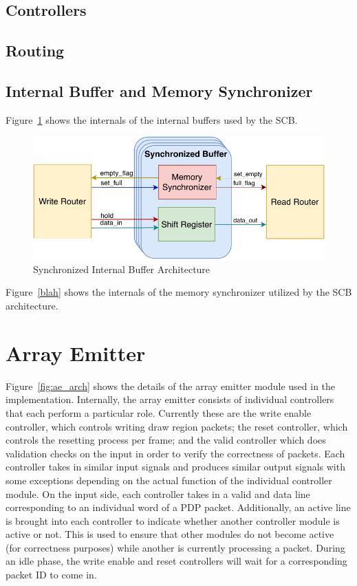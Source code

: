     \subsection{Controllers}

    \subsection{Routing}

    \subsection{Internal Buffer and Memory Synchronizer}
    \label{Sec:MemorySync}

    Figure~\ref{fig:sb_arch} shows the internals of the internal buffers used by the SCB.
    \begin{figure}
        \centering
        \includegraphics[width=1.0\textwidth]{fig/pdp_sb_arch.pdf}
        \caption{Synchronized Internal Buffer Architecture}
        \label{fig:sb_arch}
    \end{figure}

    Figure~\ref{blah} shows the internals of the memory synchronizer utilized by the SCB architecture.

\section{Array Emitter}

    Figure~\ref{fig:ae_arch} shows the details of the array emitter module used in the implementation. Internally, the array emitter consists of individual controllers that each perform a particular role. Currently these are the write enable controller, which controls writing draw region packets; the reset controller, which controls the resetting process per frame; and the valid controller which does validation checks on the input in order to verify the correctness of packets. Each controller takes in similar input signals and produces similar output signals with some exceptions depending on the actual function of the individual controller module. On the input side, each controller takes in a valid and data line corresponding to an individual word of a PDP packet. Additionally, an active line is brought into each controller to indicate whether another controller module is active or not. This is used to ensure that other modules do not become active (for correctness purposes) while another is currently processing a packet. During an idle phase, the write enable and reset controllers will wait for a corresponding packet ID to come in.

